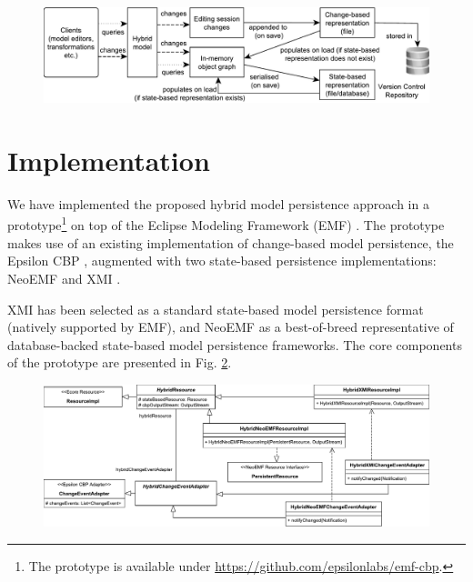 \documentclass{llncs}
\begin{document}
\begin{figure}[t]
    \includegraphics[width=\linewidth]{images/hybrid_persistence}
    \label{fig:hybrid_persistence}
\end{figure}

\vspace{-15pt}
\section{Implementation}
\label{sec:implementation}

\vspace{-10pt}
We have implemented the proposed hybrid model persistence approach in a prototype\footnote{The prototype is available under \url{https://github.com/epsilonlabs/emf-cbp}.} on top of the Eclipse Modeling Framework (EMF) \cite{steinberg2008emf}. The prototype makes use of an existing implementation of change-based model persistence, the Epsilon CBP \cite{DBLP:conf/models/YohannisKP17}, augmented with two state-based persistence implementations: NeoEMF \cite{daniel2016neoemf} and XMI \cite{omg2018xmi}.

XMI has been selected as a standard state-based model persistence format (natively supported by EMF), and NeoEMF as a best-of-breed representative of database-backed state-based model persistence frameworks. The core components of the prototype are presented in Fig. \ref{fig:class_diagram}. 

\vspace{-15pt}
\begin{figure}[ht]
    \includegraphics[width=\linewidth]{images/class_diagram}
    \label{fig:class_diagram}
\end{figure}
\end{document}
